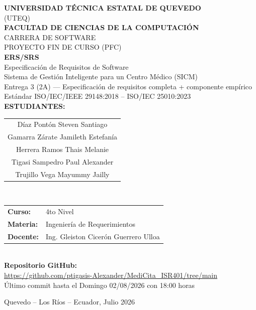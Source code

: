 \documentclass[11pt,a4paper]{article}
\begin{document}
	
	\begin{titlepage}
		\centering
		\vspace*{0.5cm}
		
		{\LARGE\bfseries\color{black} UNIVERSIDAD TÉCNICA ESTATAL DE QUEVEDO}\\[0.5cm]
		{\large (UTEQ)}\\[1.2cm]
		
		{\Large\bfseries FACULTAD DE CIENCIAS DE LA COMPUTACIÓN}\\[0.3cm]
		{\large CARRERA DE SOFTWARE}\\[0.3cm]
		{\large PROYECTO FIN DE CURSO (PFC)}\\[1.5cm]
		
		{\LARGE\bfseries ERS/SRS}\\[0.3cm]
		{\Large Especificación de Requisitos de Software}\\[0.3cm]
		{\Large Sistema de Gestión Inteligente para un Centro Médico (SICM)}\\[0.5cm]
		
		
		{\large Entrega 3 (2A) --- Especificación de requisitos completa + componente empírico}\\[0.2cm]
		{\normalsize Estándar ISO/IEC/IEEE 29148:2018 -- ISO/IEC 25010:2023}\\[1.5cm]
		
		{\large\bfseries ESTUDIANTES:}\\[0.3cm]
		\begin{tabular}{c}
			Díaz Pontón Steven Santiago \\
			Gamarra Zárate Jamileth Estefanía \\
			Herrera Ramos Thais Melanie \\
			Tigasi Sampedro Paul Alexander \\
			Trujillo Vega Mayummy Jailly
		\end{tabular}\\[1.2cm]
		
		\begin{tabular}{ll}
			\textbf{Curso:} & 4to Nivel \\
			\textbf{Materia:} & Ingeniería de Requerimientos  \\
			\textbf{Docente:} & Ing. Gleiston Cicerón Guerrero Ulloa \\
		\end{tabular}\\[1.2cm]
		
		{\small\textbf{Repositorio GitHub:}\\
			\url{https://github.com/ptigasis-Alexander/MediCita_ISR401/tree/main}}\\[1.5cm]
		
		Último commit hasta el Domingo 02/08/2026 con 18:00 horas
		
		\vfill
		{\normalsize Quevedo -- Los Ríos -- Ecuador, Julio 2026}
		
	\end{titlepage}
	
\end{document}
